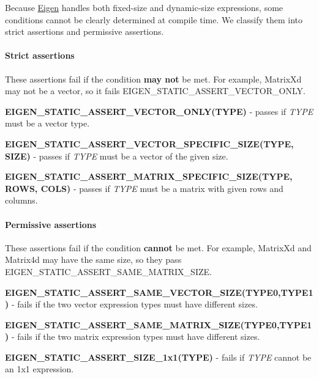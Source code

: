 Because \hyperlink{namespace_eigen}{Eigen} handles both fixed-\/size and dynamic-\/size expressions, some conditions cannot be clearly determined at compile time. We classify them into strict assertions and permissive assertions.\hypertarget{_topic_assertions_StrictAssertions}{}\paragraph{Strict assertions}\label{_topic_assertions_StrictAssertions}
These assertions fail if the condition {\bfseries may not} be met. For example, Matrix\+Xd may not be a vector, so it fails E\+I\+G\+E\+N\+\_\+\+S\+T\+A\+T\+I\+C\+\_\+\+A\+S\+S\+E\+R\+T\+\_\+\+V\+E\+C\+T\+O\+R\+\_\+\+O\+N\+LY.


\begin{DoxyItemize}
\item {\bfseries E\+I\+G\+E\+N\+\_\+\+S\+T\+A\+T\+I\+C\+\_\+\+A\+S\+S\+E\+R\+T\+\_\+\+V\+E\+C\+T\+O\+R\+\_\+\+O\+N\+L\+Y(\+T\+Y\+P\+E)} -\/ passes if {\itshape T\+Y\+PE} must be a vector type.
\item {\bfseries E\+I\+G\+E\+N\+\_\+\+S\+T\+A\+T\+I\+C\+\_\+\+A\+S\+S\+E\+R\+T\+\_\+\+V\+E\+C\+T\+O\+R\+\_\+\+S\+P\+E\+C\+I\+F\+I\+C\+\_\+\+S\+I\+Z\+E(\+T\+Y\+P\+E, S\+I\+Z\+E)} -\/ passes if {\itshape T\+Y\+PE} must be a vector of the given size.
\item {\bfseries E\+I\+G\+E\+N\+\_\+\+S\+T\+A\+T\+I\+C\+\_\+\+A\+S\+S\+E\+R\+T\+\_\+\+M\+A\+T\+R\+I\+X\+\_\+\+S\+P\+E\+C\+I\+F\+I\+C\+\_\+\+S\+I\+Z\+E(\+T\+Y\+P\+E, R\+O\+W\+S, C\+O\+L\+S)} -\/ passes if {\itshape T\+Y\+PE} must be a matrix with given rows and columns.
\end{DoxyItemize}\hypertarget{_topic_assertions_PermissiveAssertions}{}\paragraph{Permissive assertions}\label{_topic_assertions_PermissiveAssertions}
These assertions fail if the condition {\bfseries cannot} be met. For example, Matrix\+Xd and Matrix4d may have the same size, so they pass E\+I\+G\+E\+N\+\_\+\+S\+T\+A\+T\+I\+C\+\_\+\+A\+S\+S\+E\+R\+T\+\_\+\+S\+A\+M\+E\+\_\+\+M\+A\+T\+R\+I\+X\+\_\+\+S\+I\+ZE.


\begin{DoxyItemize}
\item {\bfseries E\+I\+G\+E\+N\+\_\+\+S\+T\+A\+T\+I\+C\+\_\+\+A\+S\+S\+E\+R\+T\+\_\+\+S\+A\+M\+E\+\_\+\+V\+E\+C\+T\+O\+R\+\_\+\+S\+I\+Z\+E(\+T\+Y\+P\+E0,\+T\+Y\+P\+E1)} -\/ fails if the two vector expression types must have different sizes.
\item {\bfseries E\+I\+G\+E\+N\+\_\+\+S\+T\+A\+T\+I\+C\+\_\+\+A\+S\+S\+E\+R\+T\+\_\+\+S\+A\+M\+E\+\_\+\+M\+A\+T\+R\+I\+X\+\_\+\+S\+I\+Z\+E(\+T\+Y\+P\+E0,\+T\+Y\+P\+E1)} -\/ fails if the two matrix expression types must have different sizes.
\item {\bfseries E\+I\+G\+E\+N\+\_\+\+S\+T\+A\+T\+I\+C\+\_\+\+A\+S\+S\+E\+R\+T\+\_\+\+S\+I\+Z\+E\+\_\+1x1(\+T\+Y\+P\+E)} -\/ fails if {\itshape T\+Y\+PE} cannot be an 1x1 expression.
\end{DoxyItemize}


